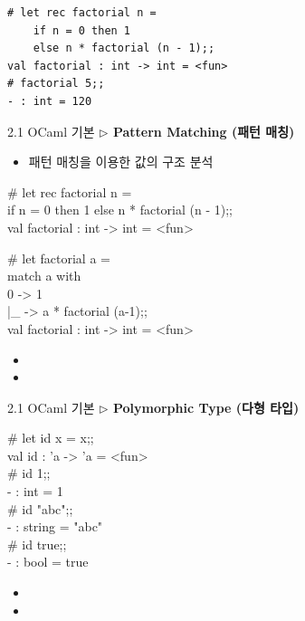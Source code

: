 \documentclass[10pt]{beamer}
\begin{document}
\begin{lstlisting}[style=zsh]
# let rec factorial n =
	if n = 0 then 1
	else n * factorial (n - 1);;    
val factorial : int -> int = <fun>
# factorial 5;;
- : int = 120
\end{lstlisting}
	\newpage
	\begin{frame}{2.1 OCaml 기본}
		\textbf{$\triangleright$ Pattern Matching (패턴 매칭)}
		
		\begin{itemize}
			\item 패턴 매칭을 이용한 값의 구조 분석
		\end{itemize}
		\begin{tcolorbox}[colback=backcolor]\ttfamily
		\# let rec factorial n =\\
			if n = 0 then 1 else n * factorial (n - 1);; \\   
		val factorial : int -> int = <fun>
		\end{tcolorbox}
		\begin{tcolorbox}[colback=backcolor]\ttfamily
			\# let factorial a = \\
			match a with\\
			0 -> 1\\
			|\_ -> a * factorial (a-1);;\\
			val factorial : int -> int = <fun>
		\end{tcolorbox}
		\begin{itemize}
			\item[]
			\item[]
		\end{itemize}
	\end{frame}

	\begin{frame}{2.1 OCaml 기본}
		\textbf{$\triangleright$ Polymorphic Type (다형 타입)}
		
		\begin{tcolorbox}[colback=backcolor]\ttfamily
			\# let id x = x;; \\
			val id : 'a -> 'a = <fun> \\
			\# id 1;; \\
			- : int = 1 \\
			\# id "abc";; \\
			- : string = "abc" \\
			\# id true;; \\
			- : bool = true \\
		\end{tcolorbox}
		\begin{itemize}
			\item[]
			\item[]
		\end{itemize}
	\end{frame}
\end{document}
